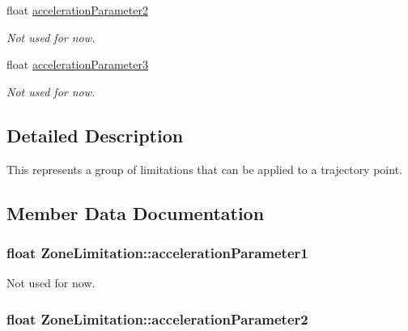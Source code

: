 \begin{DoxyCompactItemize}
float \hyperlink{struct_zone_limitation_a46267cc0a41cb1fdc2df08b87a10fc4b}{acceleration\+Parameter2}
\begin{DoxyCompactList}\small\item\em Not used for now. \end{DoxyCompactList}\item 
float \hyperlink{struct_zone_limitation_acd79cd4be6eec8b839f58c65b32a63d3}{acceleration\+Parameter3}
\begin{DoxyCompactList}\small\item\em Not used for now. \end{DoxyCompactList}\end{DoxyCompactItemize}


\subsection{Detailed Description}
This represents a group of limitations that can be applied to a trajectory point. 

\subsection{Member Data Documentation}
\subsubsection[{\texorpdfstring{acceleration\+Parameter1}{accelerationParameter1}}]{\setlength{\rightskip}{0pt plus 5cm}float Zone\+Limitation\+::acceleration\+Parameter1}\hypertarget{struct_zone_limitation_af1fd03a90f7a3abd910a734ea35484c0}{}\label{struct_zone_limitation_af1fd03a90f7a3abd910a734ea35484c0}


Not used for now. 

\subsubsection[{\texorpdfstring{acceleration\+Parameter2}{accelerationParameter2}}]{\setlength{\rightskip}{0pt plus 5cm}float Zone\+Limitation\+::acceleration\+Parameter2}\hypertarget{struct_zone_limitation_a46267cc0a41cb1fdc2df08b87a10fc4b}{}\label{struct_zone_limitation_a46267cc0a41cb1fdc2df08b87a10fc4b}


